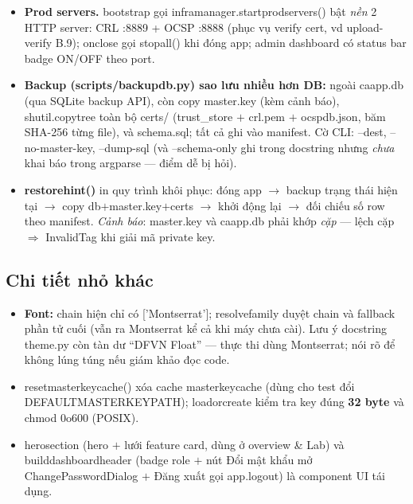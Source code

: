 \documentclass[12pt,a4paper]{article}
\newcommand{\code}[1]{{\ttfamily\small\def\_{\textunderscore\discretionary{}{}{}}#1}}
\begin{document}
\begin{itemize}
  \item \textbf{Prod servers.} \code{\_bootstrap} gọi \code{infra\_manager.start\_prod\_servers()}
        bật \emph{nền} 2 HTTP server: CRL \code{:8889} + OCSP \code{:8888} (phục vụ verify
        cert, vd upload-verify B.9); \code{\_on\_close} gọi \code{stop\_all()} khi đóng app;
        admin dashboard có status bar badge ON/OFF theo port.
  \item \textbf{Backup (\code{scripts/backup\_db.py}) sao lưu nhiều hơn DB:} ngoài
        \code{ca\_app.db} (qua SQLite backup API), còn copy \code{master.key} (kèm cảnh
        báo), \code{shutil.copytree} toàn bộ \code{certs/} (trust\_store $+$ \code{crl.pem}
        $+$ \code{ocsp\_db.json}, băm SHA-256 từng file), và \code{schema.sql}; tất cả
        ghi vào \code{manifest}. Cờ CLI: \code{--dest}, \code{--no-master-key},
        \code{--dump-sql} (và \code{--schema-only} ghi trong docstring nhưng \emph{chưa}
        khai báo trong argparse --- điểm dễ bị hỏi).
  \item \textbf{\code{restore\_hint()}} in quy trình khôi phục: đóng app $\to$ backup
        trạng thái hiện tại $\to$ copy db$+$master.key$+$certs $\to$ khởi động lại
        $\to$ đối chiếu số row theo manifest. \emph{Cảnh báo}: \code{master.key} và
        \code{ca\_app.db} phải khớp \emph{cặp} --- lệch cặp $\Rightarrow$ \code{InvalidTag}
        khi giải mã private key.
\end{itemize}

\subsection{Chi tiết nhỏ khác}

\begin{itemize}
  \item \textbf{Font:} chain hiện chỉ có \code{['Montserrat']}; \code{resolve\_family}
        duyệt chain và fallback phần tử cuối (vẫn ra Montserrat kể cả khi máy chưa cài).
        Lưu ý docstring \code{theme.py} còn tàn dư ``DFVN Float'' --- thực thi dùng
        Montserrat; nói rõ để không lúng túng nếu giám khảo đọc code.
  \item \code{reset\_master\_key\_cache()} xóa cache \code{\_master\_key\_cache} (dùng cho
        test đổi \code{DEFAULT\_MASTER\_KEY\_PATH}); \code{\_load\_or\_create} kiểm tra key
        đúng \textbf{32 byte} và \code{chmod 0o600} (POSIX).
  \item \code{hero\_section} (hero $+$ lưới feature card, dùng ở overview \& Lab) và
        \code{build\_dashboard\_header} (badge role $+$ nút Đổi mật khẩu mở
        \code{ChangePasswordDialog} $+$ Đăng xuất gọi \code{app.logout}) là component
        UI tái dụng.
\end{itemize}
\end{document}
